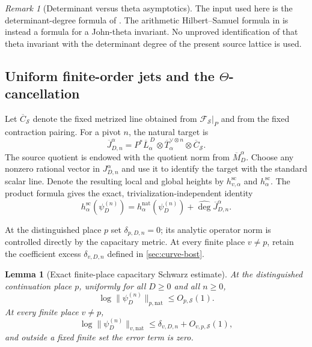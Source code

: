 \documentclass[11pt]{article}
\newtheorem{lemma}[lemma]{Lemma}
\theoremstyle{definition}
\theoremstyle{remark}
\newtheorem{remark}[remark]{Remark}
\newcommand{\calF}{\mathcal F}
\newcommand{\widehatdeg}{\widehat{\deg}}
\begin{document}
\begin{remark}[Determinant versus theta asymptotics]
The input used here is the determinant-degree formula of
\cite[Corollary~4.5.2]{ChenMoriwaki2024}.  The arithmetic Hilbert--Samuel
formula in \cite[Theorem~8.2.5]{BostCharles2022} is instead a formula for a
John-theta invariant.  No unproved identification of that theta invariant
with the determinant degree of the present source lattice is used.
\end{remark}

\subsection{Uniform finite-order jets and the \texorpdfstring{$\Theta$}{Theta}-cancellation}

Let $\overline C_{\mathcal S}$ denote the fixed metrized line obtained from
$\calF_{\mathcal S}|_P$ and from the fixed contraction pairing.  For a pivot
$n$, the natural target is
\begin{equation}\label{eq:natural-jet-line-app}
 \overline J_{D,n}^\alpha
 =P^*\overline L_\alpha^{\,D}
  \otimes\overline T_\alpha^{\vee\otimes n}
  \otimes\overline C_{\mathcal S}.
\end{equation}
The source quotient is endowed with the quotient norm from
$\overline M_D^\alpha$.  Choose any nonzero rational vector in
$J_{D,n}^\alpha$ and use it to identify the target with the standard scalar
line.  Denote the resulting local and global heights by
$h_{v,\alpha}^{\mathrm{sc}}$ and $h_\alpha^{\mathrm{sc}}$.  The product
formula gives the exact, trivialization-independent identity
\begin{equation}\label{eq:scalarization-identity}
 h_\alpha^{\mathrm{sc}}(\psi_D^{(n)})
 =h_\alpha^{\mathrm{nat}}(\psi_D^{(n)})
  +\widehatdeg\overline J_{D,n}^\alpha.
\end{equation}

At the distinguished place $p$ set $\delta_{p,D,n}=0$; its analytic
operator norm is controlled directly by the capacitary metric.  At every
finite place $v\ne p$, retain the coefficient excess
$\delta_{v,D,n}$ defined in \cref{sec:curve-bost}.

\begin{lemma}[Exact finite-place capacitary Schwarz estimate]
\label{lem:finite-order-cap-exact}
At the distinguished continuation place $p$, uniformly for all $D\ge0$ and
all $n\ge0$,
\begin{equation}\label{eq:finite-order-cap-local}
 \log\|\psi_D^{(n)}\|_{p,\mathrm{nat}}
 \le O_{p,\mathcal S}(1).
\end{equation}
At every finite place $v\ne p$,
\begin{equation}\label{eq:finite-order-coeff-local}
 \log\|\psi_D^{(n)}\|_{v,\mathrm{nat}}
 \le\delta_{v,D,n}+O_{v,p,\mathcal S}(1),
\end{equation}
and outside a fixed finite set the error term is zero.
\end{lemma}
\end{document}
